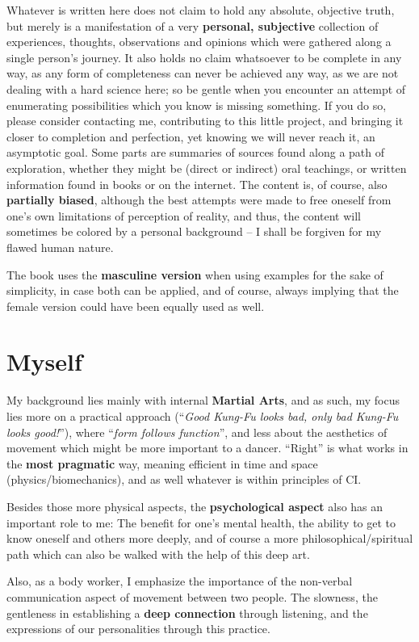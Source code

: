 Whatever is written here does not claim to hold any absolute, objective truth, but merely is a manifestation of a very \textbf{personal, subjective} collection of experiences, thoughts, observations and opinions which were gathered along a single person's journey.
It also holds no claim whatsoever to be complete in any way, as any form of completeness can never be achieved any way, as we are not dealing with a hard science here; so be gentle when you encounter an attempt of enumerating possibilities which you know is missing something.
If you do so, please consider contacting me, contributing to this little project, and bringing it closer to completion and perfection, yet knowing we will never reach it, an asymptotic goal.
Some parts are summaries of sources found along a path of exploration, whether they might be (direct or indirect) oral teachings, or written information found in books or on the internet.
The content is, of course, also \textbf{partially biased}, although the best attempts were made to free oneself from one's own limitations of perception of reality, and thus, the content will sometimes be colored by a personal background -- I shall be forgiven for my flawed human nature.

The book uses the \textbf{masculine version} when using examples for the sake of simplicity, in case both can be applied, and of course, always implying that the female version could have been equally used as well.

\section{Myself}\label{sec:myself}

My background lies mainly with internal \textbf{Martial Arts}, and as such, my focus lies more on a practical approach (``\textit{Good Kung-Fu looks bad, only bad Kung-Fu looks good!}''), where ``\textit{form follows function}'', and less about the aesthetics of movement which might be more important to a dancer.
``Right'' is what works in the \textbf{most pragmatic} way, meaning efficient in time and space (physics/biomechanics), and as well whatever is within principles of CI.

Besides those more physical aspects, the \textbf{psychological aspect} also has an important role to me: The benefit for one's mental health, the ability to get to know oneself and others more deeply, and of course a more philosophical/spiritual path which can also be walked with the help of this deep art.

Also, as a body worker, I emphasize the importance of the non-verbal communication aspect of movement between two people.
The slowness, the gentleness in establishing a \textbf{deep connection} through listening, and the expressions of our personalities through this practice.
